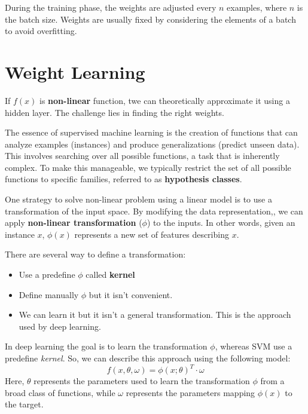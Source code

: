 \begin{note}
    During the training phase, the weights are adjusted every $n$ examples,
    where $n$ is the batch size. Weights are usually fixed by considering the
    elements of a batch to avoid overfitting.
\end{note}
\section{Weight Learning}
If $f(x)$ is \textbf{non-linear} function, twe can theoretically approximate it
using a hidden layer. The challenge lies in finding the right weights.

The essence of supervised machine learning is the creation of functions that can
analyze examples (instances) and produce generalizations (predict unseen data).
This involves searching over all possible functions, a task that is inherently
complex. To make this manageable, we typically restrict the set of all possible
functions to specific families, referred to as \textbf{hypothesis classes}.

One strategy to solve non-linear problem using a linear model is to use a
transformation of the input space. By modifying the data representation,, we can
apply \textbf{non-linear transformation} ($\phi$) to the inputs. In other words,
given an instance $x$, $\phi(x)$ represents a new set of features describing $x$.

There are several way to define a transformation:
\begin{itemize}
    \item Use a predefine $\phi$ called \textbf{kernel}
    \item Define manually $\phi$ but it isn't convenient.
    \item We can learn it but it isn't a general transformation. This is the
          approach used by deep learning.
\end{itemize}

In deep learning the goal is to learn the transformation $\phi$, whereas SVM use
a predefine \textit{kernel}. So, we can describe this approach using the
following model:
\begin{equation}
    f(x, \theta, \omega) = \phi(x; \theta)^T \cdot \omega
\end{equation}
Here, $\theta$ represents the parameters used to learn the transformation $\phi$
from a broad class of functions, while $\omega$ represents the parameters mapping
$\phi(x)$ to the target.

